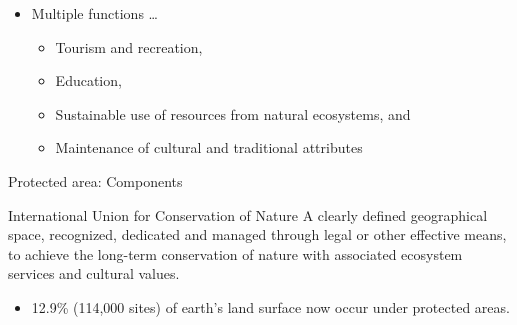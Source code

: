 \documentclass[
  ignorenonframetext,
  aspectratio=169]{beamer}
\providecommand{\tightlist}{%
  \setlength{\itemsep}{0pt}\setlength{\parskip}{0pt}}
\begin{document}
\begin{frame}{}
\protect\hypertarget{section-8}{}
\begin{itemize}
\tightlist
\item
  Multiple functions \ldots{}

  \begin{itemize}
  \tightlist
  \item
    Tourism and recreation,
  \item
    Education,
  \item
    Sustainable use of resources from natural ecosystems, and
  \item
    Maintenance of cultural and traditional attributes
  \end{itemize}
\end{itemize}
\end{frame}

\begin{frame}{Protected area: Components}
\protect\hypertarget{protected-area-components}{}
\begin{block}{International Union for Conservation of Nature}
A clearly defined geographical space, recognized, dedicated and managed through legal or other effective means, to achieve the long-term conservation of nature with associated ecosystem services and cultural values.
\end{block}

\begin{itemize}
\tightlist
\item
  12.9\% (114,000 sites) of earth's land surface now occur under
  protected areas.
\end{itemize}
\end{frame}
\end{document}
